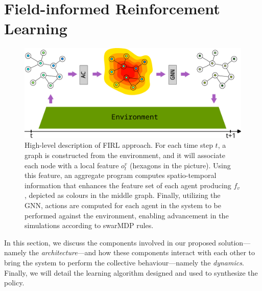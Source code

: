 \section{Field-informed Reinforcement Learning}
\label{acsos2023:sec:approach}
\begin{figure}
	\centering
  \includegraphics[width=.8\linewidth]{papers/acsos2023/imgs/architecture.pdf}

  \caption[High-level description of \ac{FIRL} approach.]{ High-level description of \ac{FIRL} approach. 
  For each time step $t$, a graph is constructed from the environment, and it will associate each node with a local feature $o^v_t$ (hexagons in the picture). 
  Using this feature, an aggregate program computes spatio-temporal information that enhances the feature set of each agent producing $f_v$, depicted as colours in the middle graph. 
  Finally, utilizing the GNN, actions are computed for each agent in the system to be performed against the environment, enabling advancement in the simulations according to swarMDP rules.
}  \label{acsos2023:fig:architecture}
\end{figure}
In this section, we discuss the components involved in our proposed solution---namely the \emph{architecture}---and how these components interact with each other to bring the system to perform the collective behaviour---namely the \emph{dynamics}. 
 Finally, we will detail the learning algorithm designed and used to synthesize the policy.

